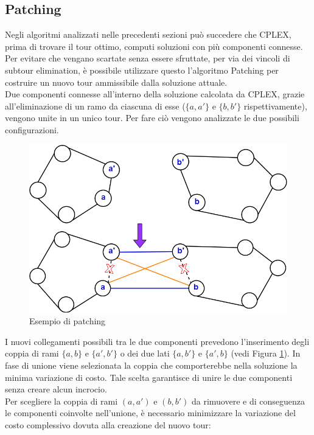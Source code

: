 \subsection{Patching}
Negli algoritmi analizzati nelle precedenti sezioni può succedere che CPLEX, prima di trovare il tour ottimo, computi soluzioni con più componenti connesse. Per evitare che vengano scartate senza essere sfruttate, per via dei vincoli di subtour elimination, è possibile utilizzare questo l'algoritmo Patching per costruire un nuovo tour ammissibile dalla soluzione attuale.\\
Due componenti connesse all'interno della soluzione calcolata da CPLEX, grazie all'eliminazione di un ramo da ciascuna di esse ($\{a, a'\}$ e  $\{b, b'\}$ rispettivamente), vengono unite in un unico tour. Per fare ciò vengono analizzate le due possibili configurazioni.\\
\begin{figure}[H] 
\begin{center} 
  \includegraphics[scale=0.3]{Images/patching}
  \caption{\footnotesize{Esempio di patching}} \label{patching} 
\end{center} 
\end{figure}
I nuovi collegamenti possibili tra le due componenti prevedono l'inserimento degli coppia di rami $\{a, b\}$ e $\{a', b'\}$ o dei due lati $\{a, b'\}$ e $\{a', b\}$ (vedi Figura \ref{patching}). In fase di unione viene selezionata la coppia che comporterebbe nella soluzione la minima variazione di costo. Tale scelta garantisce di unire le due componenti senza creare alcun incrocio.\\
Per scegliere la coppia di rami $(a, a')$ e $(b, b')$ da rimuovere e di conseguenza le componenti coinvolte nell'unione, è necessario minimizzare la variazione del costo complessivo dovuta alla creazione del nuovo tour: 
